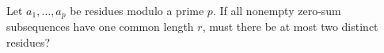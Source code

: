 Let $a_1,\ldots,a_p$ be residues modulo a prime $p$. If all nonempty zero-sum subsequences have one common length $r$, must there be at most two distinct residues?
